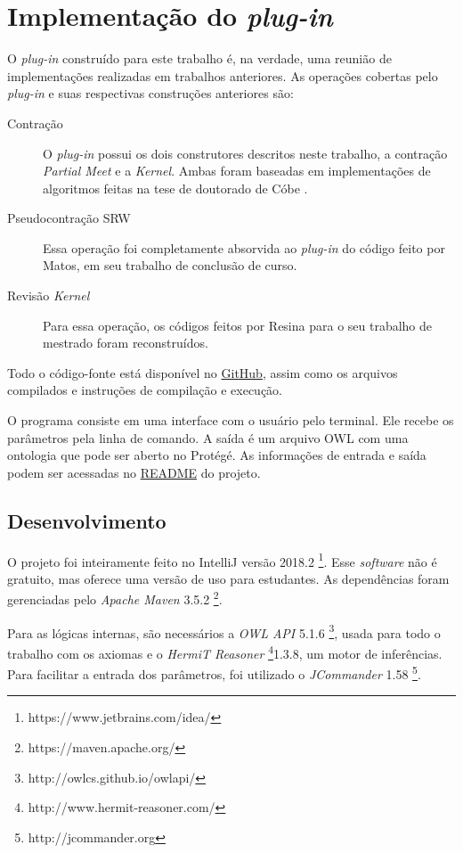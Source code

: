 \chapter{Implementação do \textit{plug-in}}
\label{chap:implementacao}

O \textit{plug-in} construído para este trabalho é, na verdade, uma reunião de implementações realizadas em trabalhos anteriores. As operações cobertas pelo \textit{plug-in} e suas respectivas construções anteriores são:

\begin{description}
	\item[Contração] O \textit{plug-in} possui os dois construtores descritos neste trabalho, a contração \textit{Partial Meet} e a \textit{Kernel}. Ambas foram baseadas em implementações de algoritmos feitas na tese de doutorado de Cóbe  \citep{revisaoCobe}.
	\item[Pseudocontração SRW] Essa operação foi completamente absorvida ao \textit{plug-in} do código feito por Matos, em seu trabalho de conclusão de curso. \citep{logicaMatos}
	\item[Revisão \textit{Kernel}] Para essa operação, os códigos feitos por Resina para o seu trabalho de mestrado \citep{logicaResina} foram reconstruídos. 
\end{description} 

Todo o código-fonte está disponível no \href{https://github.com/lsflp/ontology-repair/}{GitHub}, assim como os arquivos
compilados e instruções de compilação e execução.

O programa consiste em uma interface com o usuário pelo terminal. Ele recebe os parâmetros pela linha de comando. A saída é um arquivo OWL com uma ontologia que pode ser aberto no Protégé. As informações de entrada e saída podem ser acessadas no \href{https://github.com/lsflp/ontology-repair/blob/master/README.md}{README} do projeto.

\section{Desenvolvimento}

O projeto foi inteiramente feito no IntelliJ versão 2018.2 \footnote{https://www.jetbrains.com/idea/}. Esse \textit{software} não é gratuito, mas oferece uma versão de uso para estudantes. As dependências foram gerenciadas pelo \textit{Apache Maven} 3.5.2 \footnote{https://maven.apache.org/}.

Para as lógicas internas, são necessários a \textit{OWL API} 5.1.6 \footnote{http://owlcs.github.io/owlapi/}, usada para todo o trabalho com os axiomas e o \textit{HermiT Reasoner} \footnote{http://www.hermit-reasoner.com/}1.3.8, um motor de inferências. Para facilitar a entrada dos parâmetros, foi utilizado o \textit{JCommander} 1.58 \footnote{http://jcommander.org}.

